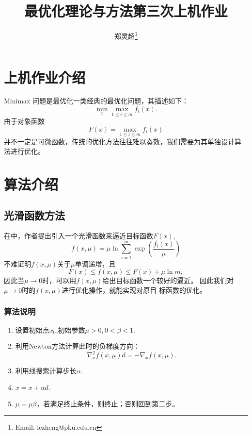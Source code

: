 \documentclass[a4paper,  11pt]{ctexart}
\begin{document}
\title{最优化理论与方法第三次上机作业}
\author{郑灵超\thanks{Email: lczheng@pku.edu.cn}}
\maketitle
\section{上机作业介绍}
Minimax 问题是最优化一类经典的最优化问题，其描述如下：
\begin{equation}
  \min_{x} \max_{1\leq i \leq m} f_i(x).
\end{equation}
由于对象函数
\begin{equation}
  F(x) = \max_{1\leq i \leq m}f_i(x) 
\end{equation}
并不一定是可微函数，传统的优化方法往往难以奏效，我们需要为其单独设计算
法进行优化。
\section{算法介绍}
\subsection{光滑函数方法}
在\cite{smooth}中，作者提出引入一个光滑函数来逼近目标函数$F(x)$,
\begin{equation}
  f(x,\mu) = \mu \ln \sum_{i=1}^m \exp\left(\frac{f_i(x)}{\mu}\right)
\end{equation}
不难证明$f(x,\mu)$关于$\mu$单调递增，且
\[ 
   F(x)\leq f(x,\mu) \leq F(x) + \mu \ln m,
\]
因此当$\mu\rightarrow 0$时，可以用$f(x,\mu)$给出目标函数一个较好的逼近。
因此我们对$\mu\rightarrow 0$时的$f(x,\mu)$进行优化操作，就能实现对原目
标函数的优化。
\subsubsection*{算法说明}
\begin{enumerate}
  \item 设置初始点$x_0$,初始参数$\mu>0,0<\beta<1$.
  \item 利用Newton方法计算此时的负梯度方向：
    \begin{equation}
      \nabla_x^2f(x,\mu)d = -\nabla_x f(x,\mu).
    \end{equation}
  \item 利用线搜索计算步长$\alpha$.
  \item $x=x+\alpha d$.
  \item $\mu = \mu\beta$，若满足终止条件，则终止；否则回到第二步。
\end{enumerate}
\end{document}
